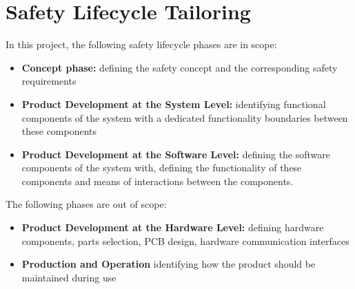 \chapter{Safety Lifecycle Tailoring}
\label{ch:safety_lifecycle_tailoring}



In this project, the following safety lifecycle phases are in scope:
\begin{itemize}
  \item \textbf{Concept phase:} 
	defining the safety concept and the corresponding safety requirements 
  \item \textbf{Product Development at the System Level:}
	identifying functional components of the system with a dedicated
	functionality boundaries between these components
  \item \textbf{Product Development at the Software Level:}
	defining the software components of the system with, defining the
	functionality of these components and means of interactions
	between the components.
\end{itemize}

The following phases are out of scope:
\begin{itemize}
  \item \textbf{Product Development at the Hardware Level:} 
	defining hardware components, parts selection, PCB design, 
	hardware communication interfaces
  \item \textbf{Production and Operation}
	identifying how the product should be maintained during use
\end{itemize}
